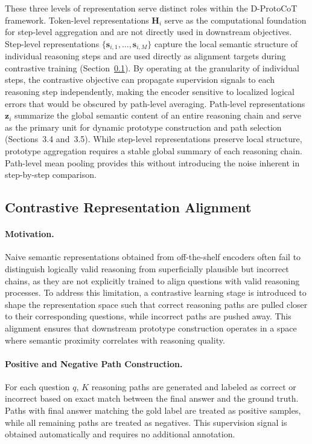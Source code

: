 \documentclass[a4paper,fleqn]{cas-dc}
\begin{document}
These three levels of representation serve distinct roles within the D-ProtoCoT framework.
Token-level representations $\mathbf{H}_i$ serve as the computational foundation for step-level aggregation and are not directly used in downstream objectives.
Step-level representations $\{\mathbf{s}_{i,1}, \ldots, \mathbf{s}_{i,M}\}$ capture the local semantic structure of individual reasoning steps and are used directly as alignment targets during contrastive training (Section~\ref{sec:contrastive}). By operating at the granularity of individual steps, the contrastive objective can propagate supervision signals to each reasoning step independently, making the encoder sensitive to localized logical errors that would be obscured by path-level averaging.
Path-level representations $\mathbf{z}_i$ summarize the global semantic content of an entire reasoning chain and serve as the primary unit for dynamic prototype construction and path selection (Sections~3.4 and~3.5). While step-level representations preserve local structure, prototype aggregation requires a stable global summary of each reasoning chain. Path-level mean pooling provides this without introducing the noise inherent in step-by-step comparison.

\subsection{Contrastive Representation Alignment}
\label{sec:contrastive}

\paragraph{Motivation.}
Naive semantic representations obtained from off-the-shelf encoders often fail to distinguish logically valid reasoning from superficially plausible but incorrect chains, as they are not explicitly trained to align questions with valid reasoning processes.
To address this limitation, a contrastive learning stage is introduced to shape the representation space such that correct reasoning paths are pulled closer to their corresponding questions, while incorrect paths are pushed away.
This alignment ensures that downstream prototype construction operates in a space where semantic proximity correlates with reasoning quality.

\paragraph{Positive and Negative Path Construction.}
For each question $q$, $K$ reasoning paths are generated and labeled as correct or incorrect based on exact match between the final answer and the ground truth.
Paths with final answer matching the gold label are treated as positive samples, while all remaining paths are treated as negatives.
This supervision signal is obtained automatically and requires no additional annotation.
\end{document}
